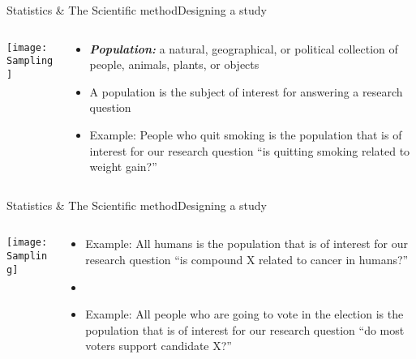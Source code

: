 \documentclass[xcolor=dvipsnames]{beamer}
\begin{document}
\begin{frame}{Statistics \& The Scientific method}{Designing a study}
	\begin{columns}
		\begin{column}{0.5 \textwidth}
			\texttt{[image: Sampling]}
		\end{column}
		\begin{column}{0.5 \textwidth}
			\begin{itemize}
				\item \textbf{\emph{Population:}} a natural, geographical, or political collection of people, animals, plants, or objects \pause
				\item A population is the subject of interest for answering a research question \pause
				\item Example: People who quit smoking is the population that is of interest for our research question ``is quitting smoking related to weight gain?''
			\end{itemize}
		\end{column}
	\end{columns}
\end{frame}

\begin{frame}{Statistics \& The Scientific method}{Designing a study}
	\begin{columns}
		\begin{column}{0.5 \textwidth}
			\texttt{[image: Sampling]}
		\end{column}
		\begin{column}{0.5 \textwidth}
			\begin{itemize}
				\item Example: All humans is the population that is of interest for our research question ``is compound X related to cancer in humans?'' \pause
				\item[]
				\item Example: All people who are going to vote in the election is the population that is of interest for our research question ``do most voters support candidate X?''
			\end{itemize}
		\end{column}
	\end{columns}
\end{frame}
\end{document}
